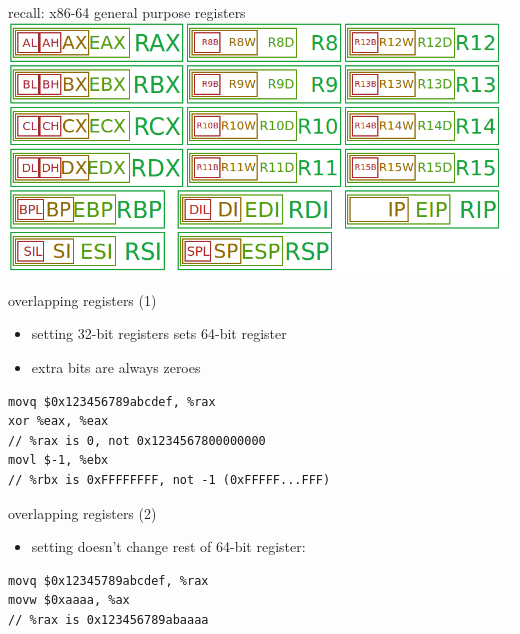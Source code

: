 \usetikzlibrary{calc}

\begin{frame}{recall: x86-64 general purpose registers}
\includegraphics[width=\textwidth]{../asm/x86-gprs}
\end{frame}

\begin{frame}[fragile,label=overlap]{overlapping registers (1)}
\begin{itemize}
\item setting 32-bit registers sets  64-bit register
\item extra bits are always zeroes
\end{itemize}
\begin{lstlisting}[style=small]
movq $0x123456789abcdef, %rax
xor %eax, %eax
// %rax is 0, not 0x1234567800000000
movl $-1, %ebx
// %rbx is 0xFFFFFFFF, not -1 (0xFFFFF...FFF)
\end{lstlisting}
\end{frame}

\begin{frame}[fragile,label=overlap2]{overlapping registers (2)}
\begin{itemize}
\item setting  doesn't change rest of 64-bit register:
\end{itemize}
\begin{lstlisting}[style=small]
movq $0x12345789abcdef, %rax
movw $0xaaaa, %ax
// %rax is 0x123456789abaaaa
\end{lstlisting}
\end{frame}

